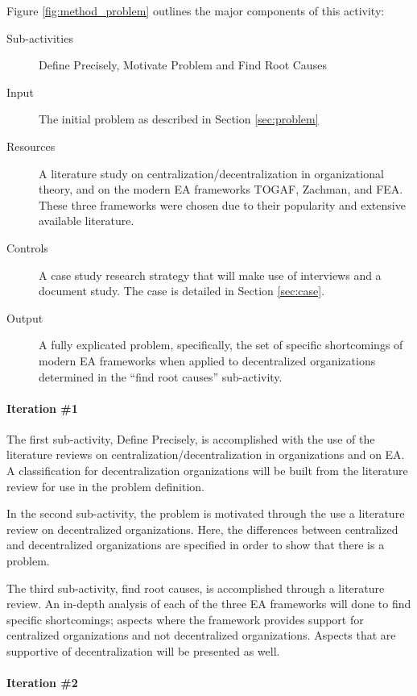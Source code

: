 Figure \ref{fig:method_problem} outlines the major components of this activity:
\begin{description}
  \item[Sub-activities] Define Precisely, Motivate Problem and Find Root Causes~\cite[Ch. 5]{johannessonPerjons2012}
  \item[Input] The initial problem as described in Section \ref{sec:problem}
  \item[Resources] A literature study on centralization/decentralization in  organizational theory, and on the modern EA frameworks TOGAF, Zachman, and FEA. These three frameworks were chosen due to their popularity and extensive available literature.
  \item[Controls] A case study research strategy that will make use of interviews and a document study. The case is detailed in Section \ref{sec:case}. 
  \item[Output] A fully explicated problem, specifically, the set of specific shortcomings of modern EA frameworks when applied to decentralized organizations determined in the ``find root causes'' sub-activity.
\end{description}

\paragraph{Iteration \#1}

The first sub-activity, Define Precisely, is accomplished with the use of the literature reviews on centralization/decentralization in  organizations and on EA. A classification for decentralization organizations will be built from the literature review for use in the problem definition. 

In the second sub-activity, the problem is motivated through the use a literature review on decentralized organizations. Here, the differences between centralized and decentralized  organizations are specified in order to show that there is a problem. 

The third sub-activity, find root causes, is accomplished through a literature review. An in-depth analysis of each of the three EA frameworks will done to find specific shortcomings; aspects where the framework provides support for centralized organizations and not decentralized organizations. Aspects that are supportive of decentralization will be presented as well.

\paragraph{Iteration \#2}

